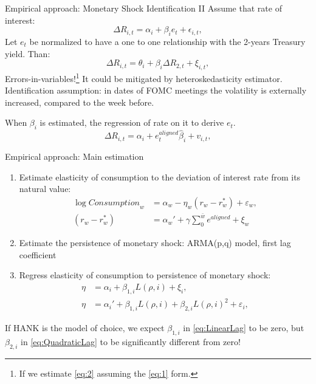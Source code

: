 \documentclass[11pt,pdf,aspectratio=129]{beamer}
\begin{document}
\begin{frame}{Empirical approach: Monetary Shock Identification II}
    Assume that rate of interest: \begin{equation}
        \Delta R_{i,t}=\alpha_i+\beta_i e_t+\epsilon_{i,t},\label{eq:1}
    \end{equation}
    Let $e_t$ be normalized to have a one to one relationship with the 2-years Treasury yield.
    Than:
    \begin{equation}
        \Delta R_{i,t}=\theta_i+\beta_i \Delta R_{2,t}+\xi_{i,t},\label{eq:2}
    \end{equation}
Errors-in-variables!\footnote{If we estimate \eqref{eq:2} assuming the \eqref{eq:1} form.} It could be mitigated by  heteroskedasticity estimator. Identification assumption: in dates of FOMC meetings the volatility is externally increased, compared to the week before.

When $\beta_i $ is estimated, the regression of rate on it to derive $e_t$.
\begin{equation}
    \Delta R_{i,t}=\alpha_i +e_t^{\textit{aligned}} \hat{\beta}_i+v_{i,t},
\end{equation}
\end{frame}


\begin{frame}{Empirical approach:  Main estimation}
    \begin{enumerate}
        \item Estimate elasticity of consumption to the deviation of interest rate from its natural value:
        \begin{align}
            \log \textit{Consumption}_{w}&=\alpha_w-\eta_w(r_{w}-r^{*}_w)+\varepsilon_w,\label{Consumption}\\
            (r_{w}-r^{*}_w)&=\alpha_w'+\gamma\sum_{0}^{\bar{w}} e^{\textit{aligned}}+\xi_w
        \end{align}
        \item Estimate the persistence of monetary shock: ARMA(p,q) model, first lag coefficient
        \item Regress elasticity of consumption to persistence of monetary shock:
        \begin{align}
            \eta&=\alpha_i+\beta_{1,i}L(\rho, i)+\xi_i,
            \label{eq:LinearLag}\\
            \eta&=\alpha_i'+\beta_{1,i}L(\rho, i)+\beta_{2,i}L(\rho,i)^2+\varepsilon_i,
            \label{eq:QuadraticLag}
        \end{align}
   
    \end{enumerate}
  \begin{block}{}
      If HANK is the model of choice,  we expect $\beta_{1,i}$ in \eqref{eq:LinearLag} to be zero, but  $\beta_{2,i}$ in \eqref{eq:QuadraticLag} to be significantly different from zero!
  \end{block}
\end{frame}
\end{document}
